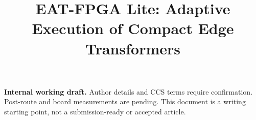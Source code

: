 \documentclass[acmsmall,screen,review,nonacm]{acmart}
\begin{document}
\title[Adaptive Execution of Compact Edge Transformers]{EAT-FPGA Lite: Adaptive Execution of Compact Edge Transformers}

\maketitle

\noindent\textbf{Internal working draft.} Author details and CCS terms require
confirmation. Post-route and board measurements are pending. This document is a
writing starting point, not a submission-ready or accepted article.














\end{document}
